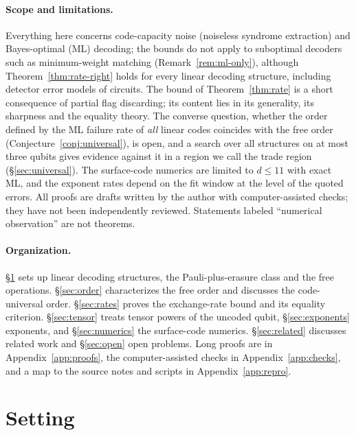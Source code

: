 \documentclass[11pt,a4paper]{article}
\theoremstyle{plain}
\theoremstyle{definition}
\theoremstyle{remark}
\begin{document}
\paragraph{Scope and limitations.}
Everything here concerns code-capacity noise (noiseless syndrome extraction) and Bayes-optimal (ML) decoding; the bounds do not apply to suboptimal decoders such as minimum-weight matching (Remark~\ref{rem:ml-only}), although Theorem~\ref{thm:rate-right} holds for every linear decoding structure, including detector error models of circuits. The bound of Theorem~\ref{thm:rate} is a short consequence of partial flag discarding; its content lies in its generality, its sharpness and the equality theory. The converse question, whether the order defined by the ML failure rate of \emph{all} linear codes coincides with the free order (Conjecture~\ref{conj:universal}), is open, and a search over all structures on at most three qubits gives evidence against it in a region we call the trade region (\S\ref{sec:universal}). The surface-code numerics are limited to $d\le11$ with exact ML, and the exponent rates depend on the fit window at the level of the quoted errors. All proofs are drafts written by the author with computer-assisted checks; they have not been independently reviewed. Statements labeled ``numerical observation'' are not theorems.

\paragraph{Organization.}
\S\ref{sec:setting} sets up linear decoding structures, the Pauli-plus-erasure class and the free operations. \S\ref{sec:order} characterizes the free order and discusses the code-universal order. \S\ref{sec:rates} proves the exchange-rate bound and its equality criterion. \S\ref{sec:tensor} treats tensor powers of the uncoded qubit, \S\ref{sec:exponents} exponents, and \S\ref{sec:numerics} the surface-code numerics. \S\ref{sec:related} discusses related work and \S\ref{sec:open} open problems. Long proofs are in Appendix~\ref{app:proofs}, the computer-assisted checks in Appendix~\ref{app:checks}, and a map to the source notes and scripts in Appendix~\ref{app:repro}.

\section{Setting}\label{sec:setting}
\end{document}
